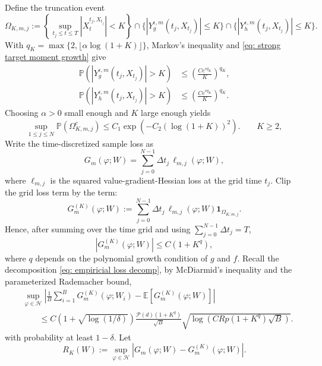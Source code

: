 \documentclass[twoside,11pt]{article}
\newcommand{\E}{\mathbb{E}}
\newcommand{\1}{\mathbf{1}}
\numberwithin{equation}{section}
\begin{document}
Define the truncation event
\[
    \Omega_{K,m,j}
    :=
    \left\{\sup_{t_j\le t\le T} \left|X_t^{t_j,X_{t_j}}\right|<K\right\}\cap\{|Y_g^{\epsilon,m}(t_j,X_{t_j})|\le K\}
    \cap
    \{|Y_h^{\epsilon,m}(t_j,X_{t_j})|\le K\}.
\]
With $q_K=\max\{2,\lfloor \alpha\log(1+K)\rfloor\}$, Markov's inequality and \eqref{eq: strong target moment growth} give
\[
\begin{aligned}
    \mathbb P(|Y_g^{\epsilon,m}(t_j,X_{t_j})|>K)
    &\le
    \left(\frac{Ce^{cq_K}}{K}\right)^{q_K},              \\
    \mathbb P(|Y_h^{\epsilon,m}(t_j,X_{t_j})|>K)
    &\le
    \left(\frac{Ce^{cq_K}}{K}\right)^{q_K}.
\end{aligned}
\]
Choosing $ \alpha >0 $ small enough and $ K$ large enough yields
\begin{equation}\label{eq: strong target truncation tail}
    \sup_{1\le j\le N}\mathbb P(\Omega_{K,m,j}^c)
    \le
    C_1\exp\!\left(-C_2(\log(1+K))^2\right).
    \qquad K\ge2,
\end{equation}
Write the time-discretized sample loss as
\[
    G_m(\varphi;W)
    =
    \sum_{j=0}^{N-1}\Delta t_j\,\ell_{m,j}(\varphi;W),
\]
where $\ell_{m,j}$ is the squared value-gradient-Hessian loss at the grid
time $t_j$. Clip the grid loss term by the term:
\[
    G_m^{(K)}(\varphi;W)
    :=
    \sum_{j=0}^{N-1}\Delta t_j\,
    \ell_{m,j}(\varphi;W)\1_{\Omega_{K,m,j}} .
\]
Hence, after summing over the time grid and using $\sum_{j=0}^{N-1}\Delta t_j=T$, 
\begin{equation}\label{eq: strong envelope}
    |G_m^{(K)}(\varphi;W)|
    \le
    C(1+K^{q}) ,
\end{equation}
where $ q$ depends on the polynomial growth condition of $ g$ and $ f$.
Recall the decomposition \eqref{eq: empiricial loss decomp}, by McDiarmid's inequality and the parameterized Rademacher bound,
\begin{equation}\label{eq: strong clipped process}
\begin{aligned}
    &\sup_{\varphi\in\mathcal H}
    \left|
    \frac1B\sum_{i=1}^B G_m^{(K)}(\varphi;W_i)
    -
    \E[G_m^{(K)}(\varphi;W)]
    \right|                                                     \\
    &\qquad\le
C(1+\sqrt{\log(1/\delta)})
\frac{\mathcal P(d)(1+K^{q})}{\sqrt B}
\sqrt{\log(CRp(1+K^{q})\sqrt B)} .
\end{aligned}
\end{equation}
with probability at least $1-\delta$. Let
\[
    R_K(W)
    :=
    \sup_{\varphi\in\mathcal H}
    |G_m(\varphi;W)-G_m^{(K)}(\varphi;W)| .
\]
\end{document}
